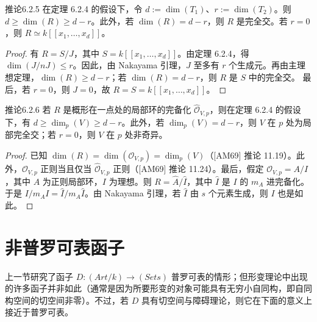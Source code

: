 \begin{origstatement}{推论}{6.2.5}\label{ch06:6.2.5}
在定理 6.2.4 的假设下，令 $d:=\dim(T_1)$、$r:=\dim(T_2)$。则 $d\geq\dim(R)\geq d-r$。此外，若 $\dim(R)=d-r$，则 $R$ 是完全交。若 $r=0$，则 $R\simeq k[[x_1,\ldots,x_d]]$。
\end{origstatement}
\begin{proof}
有 $R=S/J$，其中 $S=k[[x_1,\ldots,x_d]]$。由定理 6.2.4，得 $\dim(J/nJ)\leq r$。因此，由 Nakayama 引理，$J$ 至多有 $r$ 个生成元。再由主理想定理，$\dim(R)\geq d-r$；若 $\dim(R)=d-r$，则 $R$ 是 $S$ 中的完全交。
最后，若 $r=0$，则 $J=0$，故 $R=S=k[[x_1,\ldots,x_d]]$。
\end{proof}
\begin{origstatement}{推论}{6.2.6}\label{ch06:6.2.6}
若 $R$ 是概形在一点处的局部环的完备化 $\widehat{\mathcal O}_{V,p}$，则在定理 6.2.4 的假设下，有 $d\geq\dim_p(V)\geq d-r$。此外，若 $\dim_p(V)=d-r$，则 $V$ 在 $p$ 处为局部完全交；若 $r=0$，则 $V$ 在 $p$ 处非奇异。
\end{origstatement}
\begin{proof}
已知 $\dim(R)=\dim(\mathcal O_{V,p})=\dim_p(V)$（[AM69] 推论 11.19）。此外，$\mathcal O_{V,p}$ 正则当且仅当 $\widehat{\mathcal O}_{V,p}$ 正则（[AM69] 推论 11.24）。最后，假定 $\mathcal O_{V,p}=A/I$，其中 $A$ 为正则局部环，$I$ 为理想。则 $R=\widehat A/\widehat I$，其中 $\widehat I$ 是 $I$ 的 $m_A$ 进完备化。于是 $I/m_AI=\widehat I/m_A\widehat I$。由 Nakayama 引理，若 $\widehat I$ 由 $s$ 个元素生成，则 $I$ 也是如此。
\end{proof}
\section{非普罗可表函子}
上一节研究了函子 $D:(Art/k)\to(Sets)$ 普罗可表的情形；但形变理论中出现的许多函子并非如此（通常是因为所要形变的对象可能具有无穷小自同构，即自同构空间的切空间非零）。不过，若 $D$ 具有切空间与障碍理论，则它在下面的意义上接近于普罗可表。

